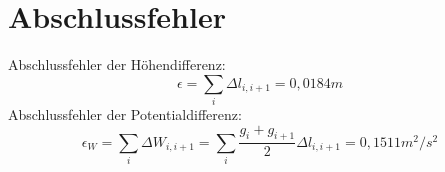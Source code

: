 \documentclass[12pt]{article}
\begin{document}
	\pagestyle{main}
\tableofcontents
\newpage
\section{Abschlussfehler}
Abschlussfehler der Höhendifferenz:
\begin{equation*}
\epsilon = \sum_{i} \Delta l_{i,i+1} = 0,0184 m
\end{equation*}
Abschlussfehler der Potentialdifferenz:
\begin{equation*}
\epsilon_W = \sum_{i} \Delta W_{i,i+1} = \sum_{i}\frac{g_i + g_{i+1}}{2} \Delta l_{i,i+1} = 0,1511 m^2/s^2
\end{equation*}
\end{document}
